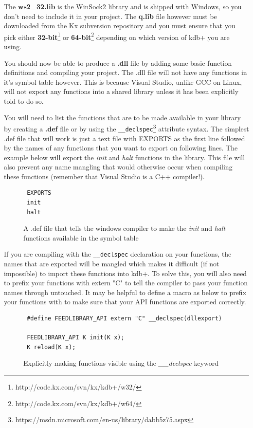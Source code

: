  The \textbf{ws2\_32.lib} is the WinSock2 library and is shipped with Windows, so you don't need to include it in your project. The \textbf{q.lib} file however must be downloaded from the Kx subversion repository and you must ensure that you pick either \textbf{32-bit}\footnote{http://code.kx.com/svn/kx/kdb+/w32/} or \textbf{64-bit}\footnote{http://code.kx.com/svn/kx/kdb+/w64/} depending on which version of kdb+ you are using.
 
 You should now be able to produce a \textbf{.dll} file by adding some basic function definitions and compiling your project. The .dll file will not have any functions in it's symbol table however. This is because Visual Studio, unlike GCC on Linux, will not export any functions into a shared library unless it has been explicitly told to do so. 
 
 You will need to list the functions that are to be made available in your library by creating a \textbf{.def} file or by using the \verb|__declspec|\footnote{https://msdn.microsoft.com/en-us/library/dabb5z75.aspx} attribute syntax. The simplest .def file that will work is just a text file with EXPORTS as the first line followed by the names of any functions that you want to export on following lines. The example below will export the \textit{init} and \textit{halt} functions in the library. This file will also prevent any name mangling that would otherwise occur when compiling these functions (remember that Visual Studio is a C++ compiler!).
 
 \begin{figure}[H]
 \begin{lstlisting}
 EXPORTS
 init
 halt
 \end{lstlisting}
 \caption{A .def file that tells the windows compiler to make the \textit{init} and \textit{halt} functions available in the symbol table}
 \end{figure}
 
 If you are compiling with the \verb|__declspec| declaration on your functions, the names that are exported will be mangled which makes it difficult (if not impossible) to import these functions into kdb+. To solve this, you will also need to prefix your functions with extern "C" to tell the compiler to pass your function names through untouched. It may be helpful to define a macro as below to prefix your functions with to make sure that your API functions are exported correctly.

\begin{figure}[h]
 \begin{lstlisting}
 #define FEEDLIBRARY_API extern "C" __declspec(dllexport)
 
 FEEDLIBRARY_API K init(K x);
 K reload(K x);
 \end{lstlisting}
 \caption{Explicitly making functions visible using the \textit{\_\_declspec} keyword}
 \end{figure}
 
